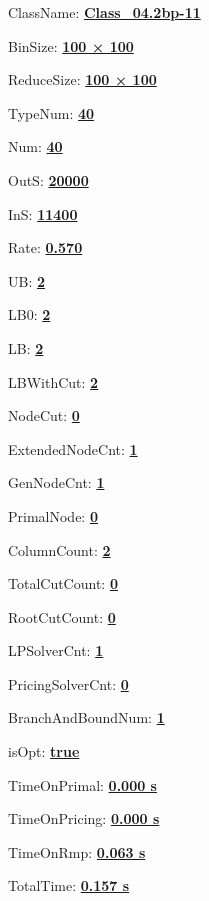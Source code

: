 \documentclass[11pt]{article}
\begin{document}
\pagestyle{empty}


ClassName: \underline{\textbf{Class_04.2bp-11}}
\par
BinSize: \underline{\textbf{100 × 100}}
\par
ReduceSize: \underline{\textbf{100 × 100}}
\par
TypeNum: \underline{\textbf{40}}
\par
Num: \underline{\textbf{40}}
\par
OutS: \underline{\textbf{20000}}
\par
InS: \underline{\textbf{11400}}
\par
Rate: \underline{\textbf{0.570}}
\par
UB: \underline{\textbf{2}}
\par
LB0: \underline{\textbf{2}}
\par
LB: \underline{\textbf{2}}
\par
LBWithCut: \underline{\textbf{2}}
\par
NodeCut: \underline{\textbf{0}}
\par
ExtendedNodeCnt: \underline{\textbf{1}}
\par
GenNodeCnt: \underline{\textbf{1}}
\par
PrimalNode: \underline{\textbf{0}}
\par
ColumnCount: \underline{\textbf{2}}
\par
TotalCutCount: \underline{\textbf{0}}
\par
RootCutCount: \underline{\textbf{0}}
\par
LPSolverCnt: \underline{\textbf{1}}
\par
PricingSolverCnt: \underline{\textbf{0}}
\par
BranchAndBoundNum: \underline{\textbf{1}}
\par
isOpt: \underline{\textbf{true}}
\par
TimeOnPrimal: \underline{\textbf{0.000 s}}
\par
TimeOnPricing: \underline{\textbf{0.000 s}}
\par
TimeOnRmp: \underline{\textbf{0.063 s}}
\par
TotalTime: \underline{\textbf{0.157 s}}
\par
\newpage
\end{document}
